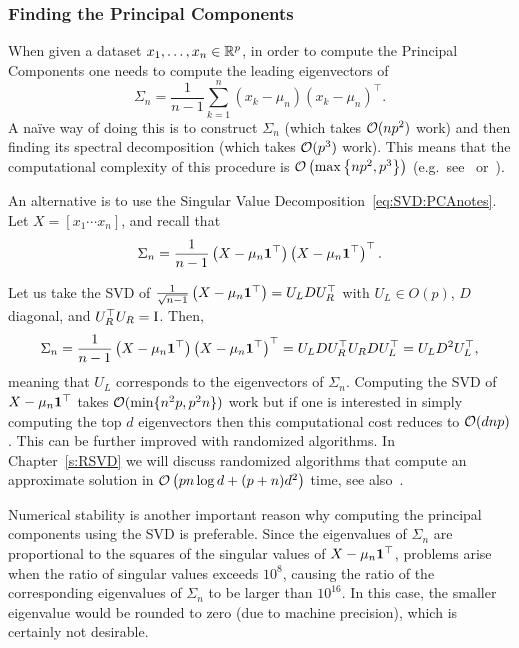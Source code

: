 \subsubsection{Finding the Principal Components}

When given a dataset $x_1,\dots,x_n\in\mathbb{R}^p$, in order to compute the Principal Components one needs to compute the leading eigenvectors of
\[
\Sigma_n = \frac1{n-1}\sum_{k=1}^n \left(x_k-\mu_n\right)\left(x_k-\mu_n\right)^\top  .
\]
A na\"ive way of doing this is to construct $\Sigma_n$ (which takes $\mathcal{O}(np^2)$ work) and then finding its spectral decomposition (which takes $\mathcal{O}(p^3)$ work). This means that the computational complexity of this procedure is $\mathcal{O}\left( \max \left\{ np^2, p^3  \right\} \right)$ (e.g.\ see~\cite{HJ90} or~\cite{Golub_MatrixComputations}).

An alternative is to use the Singular Value Decomposition~\eqref{eq:SVD:PCAnotes}. Let $X = \left[x_1 \cdots x_n  \right]$, and recall that
\[
\Sigma_n = \frac{1}{n-1} \left( X - \mu_n\mathbf{1}^\top   \right) \left( X - \mu_n\mathbf{1}^\top   \right)^\top  .
\]

Let us take the SVD of $\frac{1}{\sqrt{n-1}}\left(X - \mu_n\mathbf{1}^\top  \right) = U_L D U_R^\top  $ with $U_L \in O(p)$, $D$ diagonal, and $U_R^\top  U_R = \operatorname{I}$. Then,
\[
\Sigma_n = \frac{1}{n-1} \left( X - \mu_n\mathbf{1}^\top   \right) \left( X - \mu_n\mathbf{1}^\top   \right)^\top   = U_L D U_R^\top   U_R D U_L^\top   = U_L D^2 U_L^\top  ,
\]
meaning that $U_L$ corresponds to the eigenvectors of $\Sigma_n$. Computing the SVD of $X - \mu_n\mathbf{1}^\top  $ takes $\mathcal{O}(\min \{n^2p,p^2n\})$ work but if one is interested in simply computing the top $d$ eigenvectors then this computational cost reduces to $\mathcal{O}(dnp)$. This can be further improved with randomized algorithms. In Chapter~\ref{s:RSVD} we will discuss randomized algorithms that compute an approximate solution in $\mathcal{O}\left( pn\log d +(p+n)d^2  \right)$ time, see also~\cite{HMT11,Rokhlin_Szlam_Tygert_randPCA,Musco_Musco_BlockLanczos}.

Numerical stability is another important reason why computing the principal components using the SVD is preferable. Since the eigenvalues of $\Sigma_n$ are
proportional to the squares of the singular values of $X-\mu_n \mathbf{1}^\top  $, problems arise when the ratio of singular
values exceeds $10^8$, causing the ratio of the corresponding eigenvalues of $\Sigma_n$ to be larger than $10^{16}$. In this case, the smaller eigenvalue would be rounded to zero (due to machine precision), which is certainly
not desirable.



